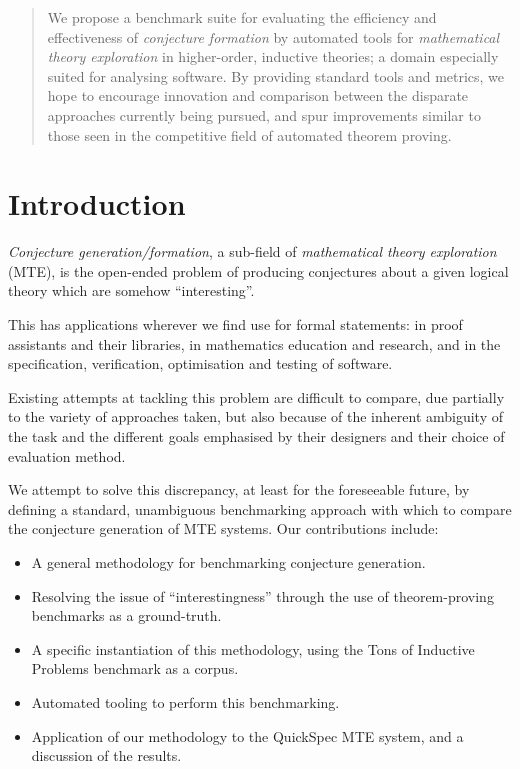 \begin{abstract}
  We propose a benchmark suite for evaluating the efficiency and effectiveness
  of \emph{conjecture formation} by automated tools for \emph{mathematical
    theory exploration} in higher-order, inductive theories; a domain especially
  suited for analysing software. By providing standard tools and metrics, we
  hope to encourage innovation and comparison between the disparate approaches
  currently being pursued, and spur improvements similar to those seen in the
  competitive field of automated theorem proving.
\end{abstract}

\section{Introduction}
\label{intro}


\emph{Conjecture generation/formation}, a sub-field of \emph{mathematical theory
  exploration} (MTE), is the open-ended problem of producing conjectures about a
given logical theory which are somehow ``interesting''.

This has applications wherever we find use for formal statements: in proof
assistants and their libraries, in mathematics education and research, and in
the specification, verification, optimisation and testing of software.

Existing attempts at tackling this problem are difficult to compare, due
partially to the variety of approaches taken, but also because of the inherent
ambiguity of the task and the different goals emphasised by their designers and
their choice of evaluation method.

We attempt to solve this discrepancy, at least for the foreseeable future, by
defining a standard, unambiguous benchmarking approach with which to compare
the conjecture generation of MTE systems. Our contributions include:

\begin{itemize}
\item A general methodology for benchmarking conjecture generation.
\item Resolving the issue of ``interestingness'' through the use of
  theorem-proving benchmarks as a ground-truth.
\item A specific instantiation of this methodology, using the Tons of Inductive
  Problems benchmark as a corpus.
\item Automated tooling to perform this benchmarking.
\item Application of our methodology to the QuickSpec MTE system, and a
  discussion of the results.
\end{itemize}

